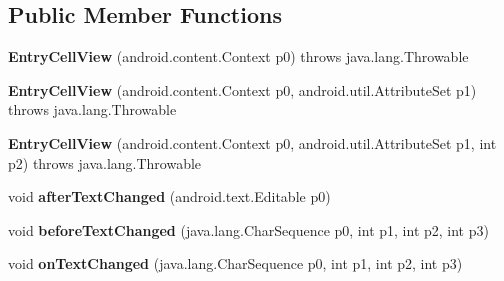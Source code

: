 \subsection*{Public Member Functions}
\begin{DoxyCompactItemize}
\item 
\mbox{\label{classmd5b60ffeb829f638581ab2bb9b1a7f4f3f_1_1EntryCellView_adbbaf6527f6daa54b8c17455243a5806}} 
{\bfseries Entry\+Cell\+View} (android.\+content.\+Context p0)  throws java.\+lang.\+Throwable 	
\item 
\mbox{\label{classmd5b60ffeb829f638581ab2bb9b1a7f4f3f_1_1EntryCellView_a34f28cd0cc7b56ce0ac2064e7138170b}} 
{\bfseries Entry\+Cell\+View} (android.\+content.\+Context p0, android.\+util.\+Attribute\+Set p1)  throws java.\+lang.\+Throwable 	
\item 
\mbox{\label{classmd5b60ffeb829f638581ab2bb9b1a7f4f3f_1_1EntryCellView_a2b0135e0b61be293bb38a6ac7d2c9b3f}} 
{\bfseries Entry\+Cell\+View} (android.\+content.\+Context p0, android.\+util.\+Attribute\+Set p1, int p2)  throws java.\+lang.\+Throwable 	
\item 
\mbox{\label{classmd5b60ffeb829f638581ab2bb9b1a7f4f3f_1_1EntryCellView_a62f9d563c0b08b8bd5ca59c1794f5ed0}} 
void {\bfseries after\+Text\+Changed} (android.\+text.\+Editable p0)
\item 
\mbox{\label{classmd5b60ffeb829f638581ab2bb9b1a7f4f3f_1_1EntryCellView_acfae287696d61b422c2c4a85025777da}} 
void {\bfseries before\+Text\+Changed} (java.\+lang.\+Char\+Sequence p0, int p1, int p2, int p3)
\item 
\mbox{\label{classmd5b60ffeb829f638581ab2bb9b1a7f4f3f_1_1EntryCellView_a330adc10508be12c9c6ce3d433f4d2cf}} 
void {\bfseries on\+Text\+Changed} (java.\+lang.\+Char\+Sequence p0, int p1, int p2, int p3)
\item 
\mbox{\label{classmd5b60ffeb829f638581ab2bb9b1a7f4f3f_1_1EntryCellView_a6c445e9cfc29651b0b8e0809663ab5b8}} 

\end{DoxyCompactItemize}
